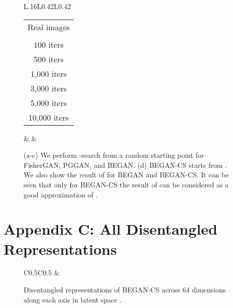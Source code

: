 \documentclass[runningheads]{llncs}
\begin{document}
\begin{figure}[!h]
        \begin{tabular}{L{.16\linewidth}L{0.42\linewidth}L{0.42\linewidth}}
            \begin{tabular}{c}
                \scriptsize Real images  \\ [0.9em]
                \scriptsize  \\ [0.9em]
                \scriptsize 100 iters \\ [0.9em]
                \scriptsize 500 iters \\ [0.9em]
                \scriptsize 1{,}000 iters \\ [0.9em]
                \scriptsize 3{,}000 iters \\ [0.9em]
                \scriptsize 5{,}000 iters \\ [0.9em]
                \scriptsize 10{,}000 iters
                \end{tabular} &
             &
        \end{tabular}
        
        \caption{(a-c) We perform -search from a random starting point  for FisherGAN, PGGAN, and BEGAN. (d) BEGAN-CS starts from . We also show the result of  for BEGAN and BEGAN-CS. It can be seen that only for BEGAN-CS the result of  can be considered as a good approximation of .}
        \label{fig:more-z-search}
    \end{figure}
    
    \vfill
    
    \clearpage
    
    \section{Appendix C: All Disentangled Representations}
    
    \begin{figure}[H]
        \centering
        \begin{tabular}{C{0.5\linewidth}C{0.5\linewidth}}
              &
        \end{tabular}
        \caption{Disentangled representations of BEGAN-CS across 64 dimensions along each axis in latent space .
        \label{figure:all-disentangled-representations}}
    \end{figure}
\end{document}
